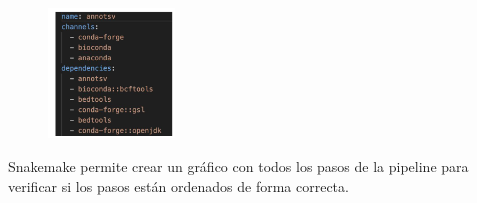 \begin{itemize}
\begin{figure}[htbp]
\centering
\includegraphics[width = 0.3\textwidth]{figs/snakemake-env.png}
\end{figure}
\end{itemize}

Snakemake permite crear un gráfico con todos los pasos de la pipeline para verificar si los pasos están ordenados de forma correcta.